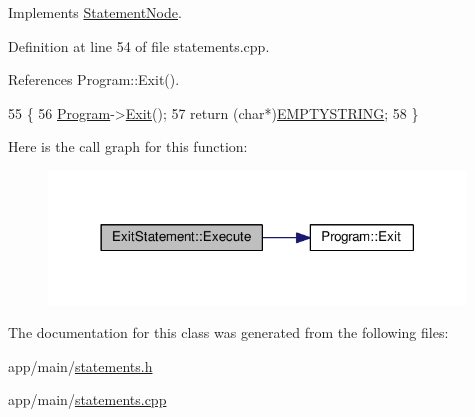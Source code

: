 Implements \hyperlink{classStatementNode_a721589622c930c010927b9a9c55b173e}{Statement\+Node}.



Definition at line 54 of file statements.\+cpp.



References Program\+::\+Exit().


\begin{DoxyCode}
55 \{
56     \hyperlink{classProgram}{Program}->\hyperlink{classProgram_adf53af02e6c4719ec0f019f0d305f80e}{Exit}();
57     \textcolor{keywordflow}{return} (\textcolor{keywordtype}{char}*)\hyperlink{platform_8h_a79ff1b9ff232b38c8b5600659e6bc7c2}{EMPTYSTRING};
58 \}
\end{DoxyCode}


Here is the call graph for this function\+:
\nopagebreak
\begin{figure}[H]
\begin{center}
\leavevmode
\includegraphics[width=314pt]{d7/dba/classExitStatement_a0c7aef922938d7f7f02b8ca402a3bd38_cgraph}
\end{center}
\end{figure}




The documentation for this class was generated from the following files\+:\begin{DoxyCompactItemize}
\item 
app/main/\hyperlink{statements_8h}{statements.\+h}\item 
app/main/\hyperlink{statements_8cpp}{statements.\+cpp}\end{DoxyCompactItemize}

